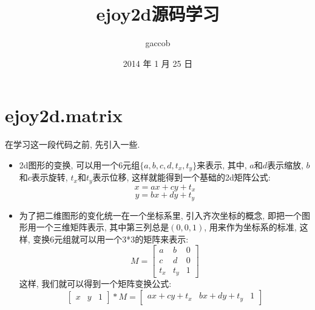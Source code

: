 

\title {\ZHH \huge ejoy2d源码学习}
\author {\small gaccob}
\date {\small 2014 年 1 月 25 日}
\maketitle

\vspace {10pt}
\section{\huge \ZHH ejoy2d.matrix} {
    { 在学习这一段代码之前, 先引入一些{}. }

    \begin {itemize}

    \item {
        2d图形的变换, 可以用一个6元组$\{a, b, c, d, t_x, t_y\}$来表示, 其中, $a$和$d$表示缩放, $b$和$c$表示旋转, $t_x$和$t_y$表示位移, 这样就能得到一个基础的2d矩阵公式:
        \begin{equation}\label{raw1}
            x = ax + cy + t_x
        \end{equation}
        \begin{equation}\label{raw2}
            y = bx + dy + t_y
        \end{equation}
    }

    \item {
        为了把二维图形的变化统一在一个坐标系里, 引入齐次坐标的概念, 即把一个图形用一个三维矩阵表示, 其中第三列总是$(0,0,1)$, 用来作为坐标系的标准, 这样, 变换6元组就可以用一个3*3的矩阵来表示:
         \begin{equation}\label{matrix}
            M =
            \begin{bmatrix}
                a & b & 0 \\
                c & d & 0 \\
                t_x & t_y & 1
            \end{bmatrix}
        \end{equation}
        这样, 我们就可以得到一个矩阵变换公式:
        \begin{equation}\label{transform}
            \begin{bmatrix}
                x & y & 1
            \end{bmatrix}
            * M =
            \begin{bmatrix}
                ax + cy + t_x & bx + dy + t_y & 1
            \end{bmatrix}
        \end{equation}
    }


\end{itemize}}

